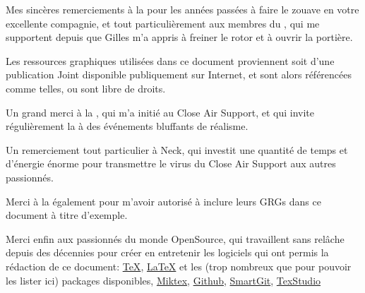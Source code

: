 %

\begin{imini}
Mes sincères remerciements à la \thirdwing{} pour les années passées à faire le zouave en votre excellente compagnie, et tout particulièrement aux membres du \rgt{} \inmem{}, qui me supportent depuis que Gilles m'a appris à freiner le rotor et à ouvrir la portière.

Les ressources graphiques utilisées dans ce document proviennent soit d'une publication Joint disponible publiquement sur Internet, et sont alors référencées comme telles, ou sont libre de droits.

Un grand merci à la \onethreetwo{}, qui m'a initié au Close Air Support, et qui invite régulièrement la \thirdwing{} à des événements bluffants de réalisme.


Un remerciement tout particulier à Neck, qui investit une quantité de temps et d'énergie énorme pour transmettre le virus du Close Air Support aux autres passionnés.


Merci à la \onethreetwo{} également pour m'avoir autorisé à inclure leurs GRGs dans ce document à titre d'exemple.

%
%
Merci enfin aux passionnés du monde OpenSource, qui travaillent sans relâche depuis des décennies pour créer en entretenir les logiciels qui ont permis la rédaction de ce document:
\href{https://www.tug.org/}{TeX}, \href{https://www.latex-project.org/}{\LaTeX} et les (trop nombreux que pour pouvoir les lister ici) packages disponibles, \href{http://miktex.org/}{Miktex}, \href{https://github.com/}{Github}, \href{https://www.syntevo.com/smartgit/}{SmartGit}, \href{http://www.texstudio.org/}{TexStudio}%



\end{imini}